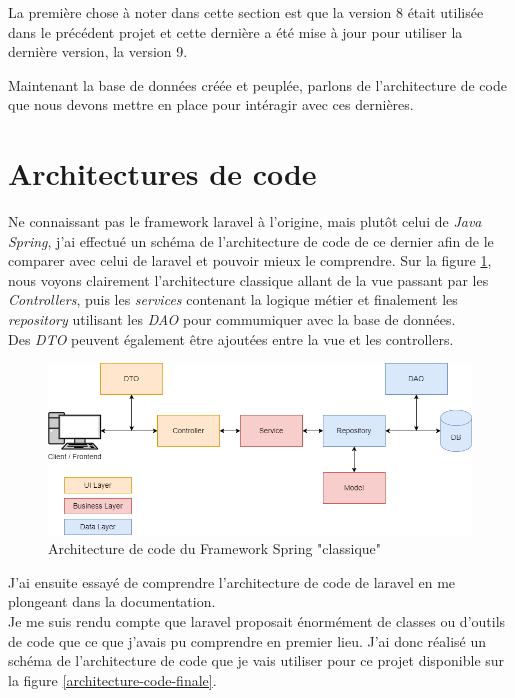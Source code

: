 \documentclass[
    iai, %
    il, %
]{heig-tb}
\begin{document}
La première chose à noter dans cette section est que la version 8 était utilisée dans le précédent projet et cette dernière a été mise à jour pour utiliser la dernière version, la version 9.

Maintenant la base de données créée et peuplée, parlons de l'architecture de code que nous devons mettre en place pour intéragir avec ces dernières.

\section{Architectures de code}

Ne connaissant pas le \Gls{framework} \Gls{laravel} à l'origine, mais plutôt celui de \emph{Java Spring}, j'ai effectué un schéma de l'architecture de code de ce dernier afin de le comparer avec celui de \Gls{laravel} et pouvoir mieux le comprendre. Sur la figure \ref{architecture-code-spring}, nous voyons clairement l'architecture classique allant de la vue passant par les \emph{Controllers}, puis les \emph{services} contenant la logique métier et finalement les \emph{repository} utilisant les \emph{DAO} pour commumiquer avec la base de données. \\
Des \emph{DTO} peuvent également être ajoutées entre la vue et les controllers.

\begin{center}
    \begin{figure}[H]
        \includegraphics[width=\textwidth]{./assets/figures/architecture-code-spring.drawio.png}
        \caption{Architecture de code du Framework Spring "classique" \label{architecture-code-spring}}
    \end{figure}
\end{center}

J'ai ensuite essayé de comprendre l'architecture de code de \Gls{laravel} en me plongeant dans la documentation. \\
Je me suis rendu compte que \Gls{laravel} proposait énormément de classes ou d'outils de code que ce que j'avais pu comprendre en premier lieu. J'ai donc réalisé un schéma de l'architecture de code que je vais utiliser pour ce projet disponible sur la figure \ref{architecture-code-finale}.
\end{document}
